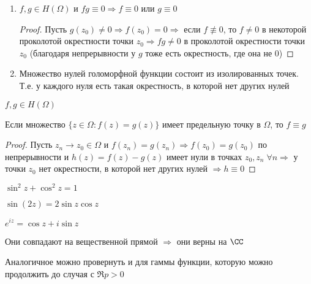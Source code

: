 \begin{consequence}\thmslashn
	
	\begin{enumerate}
		\item 
		$f, g \in H(\Omega)$ и $fg\equiv 0 \Rightarrow f\equiv 0$ или $g\equiv 0$

		\begin{proof}\thmslashn
			
            Пусть $g(z_0) \not = 0  \Rightarrow f(z_0) = 0 \Rightarrow$ если $f \not\equiv 0$, то $f\not=0$ в некоторой проколотой окрестности точки $z_0 \Rightarrow fg \not= 0$ в проколотой окрестности точки $z_0$ (благодаря непрерывности у $g$ тоже есть окрестность, где она не 0)
		\end{proof}

		\item
		Множество нулей голоморфной функции состоит из изолированных точек. Т.е. у каждого нуля есть такая окрестность, в которой нет других нулей
	\end{enumerate}

\end{consequence}

\begin{theorem}\thmslashn
	
	$f, g \in H(\Omega)$
	
	Если множество $\{ z \in \Omega: f(z) = g(z)\}$ имеет предельную точку в $\Omega$, то $f\equiv g$
	
\end{theorem}

\begin{proof}\thmslashn
	
	Пусть $z_n \to z_0 \in \Omega$ и $f(z_n) = g(z_n) \Rightarrow f(z_0) = g(z_0)$ по непрерывности и $h(z) = f(z) - g(z)$ имеет нули в точках $z_0, z_n \; \forall n \Rightarrow$ у точки $z_0$ нет окрестности, в которой нет других нулей $\Rightarrow h\equiv 0$ 
\end{proof}

\begin{consequence}\thmslashn
	
	$\sin^2z + \cos^2 z = 1$
	
	$\sin(2z) = 2\sin z \cos z$
	
	$e^{iz} = \cos z + i \sin z$
	
	Они совпадают на вещественной прямой $\Rightarrow$ они верны на $\CC$
	
	Аналогичное можно провернуть и для гаммы функции, которую можно продолжить до случая с $\Re p > 0$
	
\end{consequence}